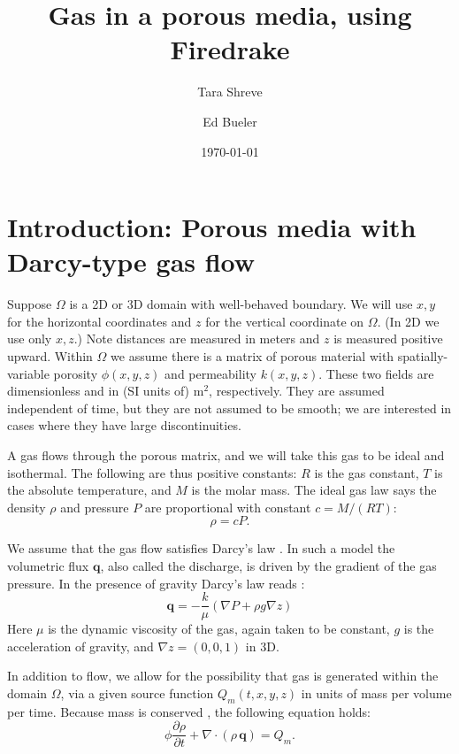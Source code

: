 \documentclass[11pt]{amsart}
\title{Gas in a porous media, using Firedrake}
\author{Tara Shreve}
\author{Ed Bueler}
\date{\today}
\newcommand{\bq}{\mathbf{q}}
\newcommand{\Div}{\nabla\cdot}
\newcommand{\grad}{\nabla}
\begin{document}
\maketitle

\thispagestyle{empty}

\section{Introduction: Porous media with Darcy-type gas flow}

Suppose $\Omega$ is a 2D or 3D domain with well-behaved boundary.  We will use $x,y$ for the horizontal coordinates and $z$ for the vertical coordinate on $\Omega$.  (In 2D we use only $x,z$.)  Note distances are measured in meters and $z$ is measured positive upward.  Within $\Omega$ we assume there is a matrix of porous material with spatially-variable porosity $\phi(x,y,z)$ and permeability $k(x,y,z)$.  These two fields are dimensionless and in (SI units of) $\text{m}^2$, respectively.  They are assumed independent of time, but they are not assumed to be smooth; we are interested in cases where they have large discontinuities.

A gas flows through the porous matrix, and we will take this gas to be ideal and isothermal.  The following are thus positive constants: $R$ is the gas constant, $T$ is the absolute temperature, and $M$ is the molar mass.  The ideal gas law says the density $\rho$ and pressure $P$ are proportional with constant $c = M/(RT)$:
\begin{equation}
\rho = c P.  \label{eq:ideal}
\end{equation}

We assume that the gas flow satisfies Darcy's law \citep{Fowler2011}.  In such a model the volumetric flux $\bq$, also called the discharge, is driven by the gradient of the gas pressure.  In the presence of gravity Darcy's law reads \citep{Collinson2012}:
\begin{equation}
\bq = - \frac{k}{\mu} \left(\grad P + \rho g \grad z\right) \label{eq:pmtime:darcy}
\end{equation}
Here $\mu$ is the dynamic viscosity of the gas, again taken to be constant, $g$ is the acceleration of gravity, and $\grad z = (0,0,1)$ in 3D.  

In addition to flow, we allow for the possibility that gas is generated within the domain $\Omega$, via a given source function $Q_m(t,x,y,z)$ in units of mass per volume per time.  Because mass is conserved \citep{Tadmor2012}, the following equation holds:
\begin{equation}
\phi \frac{\partial \rho}{\partial t} + \Div \left(\rho\, \bq\right) = Q_m. \label{eq:pmtime:masscont}
\end{equation}
\end{document}
